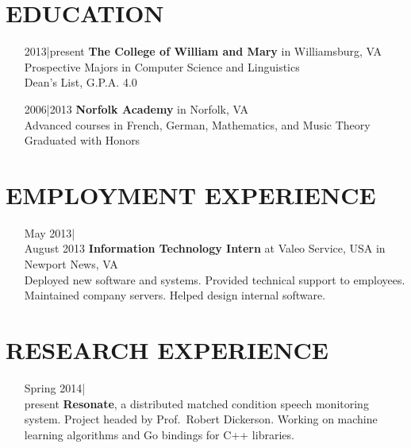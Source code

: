 \documentclass{res}
\begin{document}
\begin{resume}

\section{EDUCATION}          
\vspace{6mm}
\begin{itemize}[font=\itshape,align=parleft,labelwidth=3cm,leftmargin=2cm]
    \item[2013|present]
        \textbf{The College of William and Mary} in Williamsburg, VA \\
        Prospective Majors in Computer Science and Linguistics \\
        Dean's List, G.P.A. 4.0
    \item[2006|2013]
        \textbf{Norfolk Academy} in Norfolk, VA \\
        Advanced courses in French, German, Mathematics, and Music Theory \\
        Graduated with Honors
\end{itemize}

\section{EMPLOYMENT EXPERIENCE}
\vspace{6mm}
\begin{itemize}[font=\itshape,align=parleft,labelwidth=3cm,leftmargin=2cm]
    \item[May 2013|\\August 2013]
        \textbf{Information Technology Intern}
        at Valeo Service, USA
        in Newport News, VA
        \vspace{1mm}
        \\
        Deployed new software and systems.
        Provided technical support to employees.
        Maintained company servers.
        Helped design internal software.
\end{itemize}

\section{RESEARCH EXPERIENCE}
\vspace{6mm}
\begin{itemize}[font=\itshape,align=parleft,labelwidth=3cm,leftmargin=2cm]
    \item[Spring 2014|\\present]
        \textbf{Resonate}, a distributed matched condition speech monitoring system. Project headed by Prof.\ Robert Dickerson. Working on machine learning algorithms and Go bindings for C{\footnotesize ++} libraries.
\end{itemize}


\end{resume}
\end{document}
